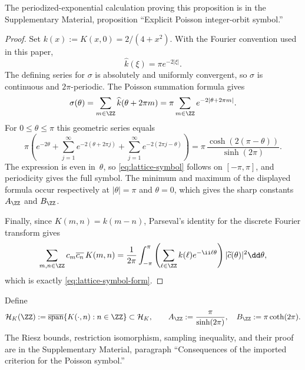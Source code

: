 \ifdefined\JFAArticleMain
The periodized-exponential calculation proving this proposition is in the
Supplementary Material, proposition ``Explicit Poisson integer-orbit
symbol.''
\else
\begin{proof}
Set $k(x):=K(x,0)=2/(4+x^2)$.  With the Fourier convention used in this
paper,
\[
\widehat k(\xi)=\pi e^{-2|\xi|}.
\]
The defining series for $\sigma$ is absolutely and uniformly convergent,
so $\sigma$ is continuous and $2\pi$-periodic.
The Poisson summation formula \cite[Chapter~III]{Stein1971} gives
\[
\sigma(\theta)=\sum_{m\in\ZZ}\widehat k(\theta+2\pi m)
=\pi\sum_{m\in\ZZ}e^{-2|\theta+2\pi m|}.
\]
For $0\le\theta\le\pi$ this geometric series equals
\[
\pi\left(e^{-2\theta}
+\sum_{j=1}^{\infty}e^{-2(\theta+2\pi j)}
+\sum_{j=1}^{\infty}e^{-2(2\pi j-\theta)}\right)
=\pi\,\frac{\cosh(2(\pi-\theta))}{\sinh(2\pi)}.
\]
The expression is even in~$\theta$, so \eqref{eq:lattice-symbol} follows
on $[-\pi,\pi]$, and periodicity gives the full symbol.
The minimum and maximum of the displayed formula occur respectively at
$|\theta|=\pi$ and $\theta=0$, which gives the sharp constants
$A_{\ZZ}$ and $B_{\ZZ}$.

Finally, since $K(m,n)=k(m-n)$, Parseval's identity for the discrete
Fourier transform gives
\[
\sum_{m,n\in\ZZ}c_m\overline{c_n}\,K(m,n)
=\frac{1}{2\pi}\int_{-\pi}^{\pi}
\left(\sum_{\ell\in\ZZ}k(\ell)e^{-\ii\ell\theta}\right)
|\widetilde c(\theta)|^2\dd\theta,
\]
which is exactly \eqref{eq:lattice-symbol-form}.
\end{proof}
\fi

\ifdefined\JFAArticleMain
Define
\[
\mathcal H_K(\ZZ):=
\overline{\operatorname{span}}\{K(\cdot,n):n\in\ZZ\}
\subset\mathcal H_K,
\qquad
A_{\ZZ}:=\frac{\pi}{\sinh(2\pi)},\quad
B_{\ZZ}:=\pi\coth(2\pi).
\]
The Riesz bounds, restriction isomorphism, sampling inequality, and their
proof are in the Supplementary Material, paragraph ``Consequences of the
imported criterion for the Poisson symbol.''
\else
